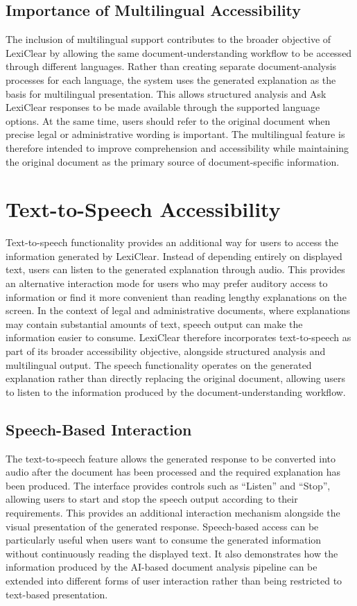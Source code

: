 \documentclass[12pt,a4paper,oneside]{report}
\begin{document}
\subsection{Importance of Multilingual Accessibility}

The inclusion of multilingual support contributes to the broader objective of
LexiClear by allowing the same document-understanding workflow to be accessed
through different languages. Rather than creating separate document-analysis
processes for each language, the system uses the generated explanation as the
basis for multilingual presentation. This allows structured analysis and
Ask LexiClear responses to be made available through the supported language
options. At the same time, users should refer to the original document when
precise legal or administrative wording is important. The multilingual
feature is therefore intended to improve comprehension and accessibility
while maintaining the original document as the primary source of
document-specific information.

\section{Text-to-Speech Accessibility}

Text-to-speech functionality provides an additional way for users to access
the information generated by LexiClear. Instead of depending entirely on
displayed text, users can listen to the generated explanation through audio.
This provides an alternative interaction mode for users who may prefer
auditory access to information or find it more convenient than reading
lengthy explanations on the screen. In the context of legal and
administrative documents, where explanations may contain substantial amounts
of text, speech output can make the information easier to consume. LexiClear
therefore incorporates text-to-speech as part of its broader accessibility
objective, alongside structured analysis and multilingual output. The speech
functionality operates on the generated explanation rather than directly
replacing the original document, allowing users to listen to the information
produced by the document-understanding workflow.

\subsection{Speech-Based Interaction}

The text-to-speech feature allows the generated response to be converted
into audio after the document has been processed and the required explanation
has been produced. The interface provides controls such as ``Listen'' and
``Stop'', allowing users to start and stop the speech output according to
their requirements. This provides an additional interaction mechanism
alongside the visual presentation of the generated response. Speech-based
access can be particularly useful when users want to consume the generated
information without continuously reading the displayed text. It also
demonstrates how the information produced by the AI-based document analysis
pipeline can be extended into different forms of user interaction rather
than being restricted to text-based presentation.
\end{document}
